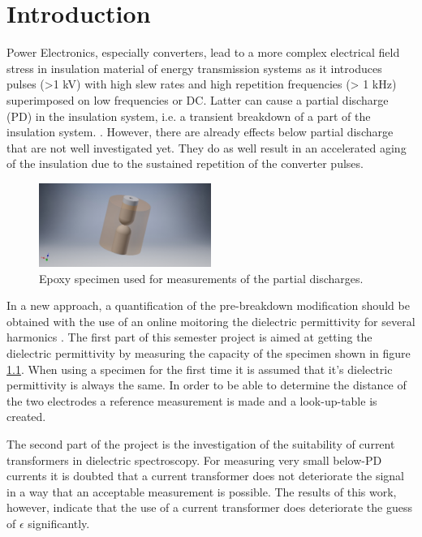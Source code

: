
\chapter{Introduction}
Power Electronics, especially converters, lead to a more complex electrical field stress in insulation material of energy transmission systems as it introduces pulses (>1 kV) with high slew rates and high repetition frequencies (> 1 kHz) superimposed on low frequencies or DC. Latter can cause a partial discharge (PD) in the insulation system, i.e. a transient breakdown of a part of the insulation system. \cite{TransformerEngineering}. However, there are already effects below partial discharge that are not well investigated yet. They do as well result in an accelerated aging of the insulation due to the sustained repetition of the converter pulses. 
\newline


\begin{figure}[!ht]
  
  
  \centerline{\includegraphics[width=0.5\textwidth]{figures/intro/epoxy_specimen.jpg}}
\caption{Epoxy specimen used for measurements of the partial discharges. \protect\footnotemark}
	\label{fig.specimen}
\end{figure}

In a new approach, a quantification of the pre-breakdown modification should be obtained with the use of an online moitoring the dielectric permittivity for several harmonics \cite{FaerberMVISS}.
The first part of this semester project is aimed at getting the dielectric permittivity by measuring the capacity of the specimen shown in figure \ref{fig.specimen}. When using a specimen for the first time it is assumed that it's dielectric permittivity is always the same. In order to be able to determine the distance of the two electrodes a reference measurement is made and a look-up-table is created. 

The second part of the project is the investigation of the suitability of current transformers in dielectric spectroscopy. For measuring very small below-PD currents it is doubted that a current transformer does not deteriorate the signal in a way that an acceptable measurement is possible. The results of this work, however, indicate that the use of a current transformer does deteriorate the guess of $\epsilon$ significantly. 


